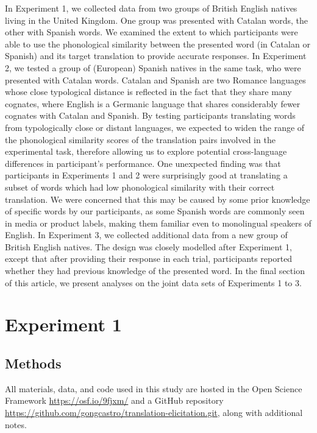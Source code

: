 \documentclass[
]{article}
\begin{document}
In Experiment 1, we collected data from two groups of British English
natives living in the United Kingdom. One group was presented with
Catalan words, the other with Spanish words. We examined the extent to
which participants were able to use the phonological similarity between
the presented word (in Catalan or Spanish) and its target translation to
provide accurate responses. In Experiment 2, we tested a group of
(European) Spanish natives in the same task, who were presented with
Catalan words. Catalan and Spanish are two Romance languages whose close
typological distance is reflected in the fact that they share many
cognates, where English is a Germanic language that shares considerably
fewer cognates with Catalan and Spanish. By testing participants
translating words from typologically close or distant languages, we
expected to widen the range of the phonological similarity scores of the
translation pairs involved in the experimental task, therefore allowing
us to explore potential cross-language differences in participant's
performance. One unexpected finding was that participants in Experiments
1 and 2 were surprisingly good at translating a subset of words which
had low phonological similarity with their correct translation. We were
concerned that this may be caused by some prior knowledge of specific
words by our participants, as some Spanish words are commonly seen in
media or product labels, making them familiar even to monolingual
speakers of English. In Experiment 3, we collected additional data from
a new group of British English natives. The design was closely modelled
after Experiment 1, except that after providing their response in each
trial, participants reported whether they had previous knowledge of the
presented word. In the final section of this article, we present
analyses on the joint data sets of Experiments 1 to 3.

\section{Experiment 1}\label{experiment-1}

\subsection{Methods}\label{methods}

All materials, data, and code used in this study are hosted in the Open
Science Framework
\href{https://osf.io/9fjxm/?view_only=aab7636ce1af48cf832596a7ea9101c5/}{https://osf.io/9fjxm/}
and a GitHub repository
\url{https://github.com/gongcastro/translation-elicitation.git}, along
with additional notes.
\end{document}
